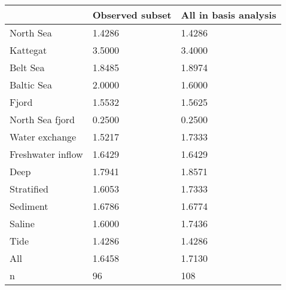 \begin{tabular}{lll}
\toprule
 & Observed subset & All in basis analysis \\
\midrule
North Sea & 1.4286 & 1.4286 \\
Kattegat & 3.5000 & 3.4000 \\
Belt Sea & 1.8485 & 1.8974 \\
Baltic Sea & 2.0000 & 1.6000 \\
Fjord & 1.5532 & 1.5625 \\
North Sea fjord & 0.2500 & 0.2500 \\
Water exchange & 1.5217 & 1.7333 \\
Freshwater inflow & 1.6429 & 1.6429 \\
Deep & 1.7941 & 1.8571 \\
Stratified & 1.6053 & 1.7333 \\
Sediment & 1.6786 & 1.6774 \\
Saline & 1.6000 & 1.7436 \\
Tide & 1.4286 & 1.4286 \\
All & 1.6458 & 1.7130 \\
n & 96 & 108 \\
\bottomrule
\end{tabular}
